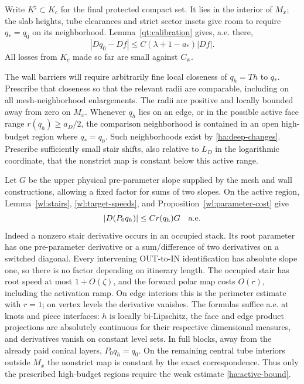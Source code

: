 \documentclass[11pt]{article}
\numberwithin{equation}{section}
\theoremstyle{definition}
\theoremstyle{remark}
\begin{document}
Write $K^\sharp\subset K_c$ for the final protected compact set.
It lies in the interior of $M_x$; the slab heights, tube clearances
and strict sector insets give room to require $q_*=q_0$ on its
neighborhood.  Lemma~\ref{qt:calibration} gives, a.e. there,
\begin{equation}\label{ha:relative-calibration}
                   |Dq_0-Df|\le C(\lambda+1-a_*)|Df|.
\end{equation}
All losses from $K_c$ made so far are small against $C_{\mathrm w}$.

The wall barriers will require arbitrarily fine local closeness of
$q_h=Th$ to $q_*$.  Prescribe that closeness so that the relevant radii
are comparable, including on all mesh-neighborhood enlargements.
The radii are positive and locally bounded away from zero on $M_x$.
Whenever $q_h$ lies on an edge, or in the possible active face range
$r(q_h)\ge a_D/2$, the comparison neighborhood is contained in an
open high-budget region where $q_*=q_0$.  Such neighborhoods exist by
\eqref{ha:deep-changes}.  Prescribe sufficiently small stair shifts,
also relative to $L_D$ in the logarithmic coordinate, that the
nonstrict map is constant below this active range.

Let $G$ be the upper physical pre-parameter slope supplied by the
mesh and wall constructions, allowing a fixed factor for sums of
two slopes.  On the active region, Lemma~\ref{wl:stairs},
\eqref{wl:target-speeds}, and Proposition~\ref{wl:parameter-cost} give
\begin{equation}\label{ha:active-bound}
                      |D(P_0q_h)|\le Cr(q_h)G
                      \quad\hbox{a.e.}
\end{equation}
Indeed a nonzero stair derivative occurs in an occupied stack.  Its
root parameter has one pre-parameter derivative or a sum/difference
of two derivatives on a switched diagonal.  Every intervening
OUT-to-IN identification has absolute slope one, so there is no
factor depending on itinerary length.  The occupied stair has root
speed at most $1+O(\zeta)$, and the forward polar map costs $O(r)$,
including the activation ramp.  On edge interiors this is the
perimeter estimate with $r=1$; on vertex levels the derivative
vanishes.  The formulas suffice a.e. at knots and piece interfaces:
$h$ is locally bi-Lipschitz, the face and edge product projections
are absolutely continuous for their respective dimensional measures,
and derivatives vanish on constant level sets.  In full blocks,
away from the already paid conical layers, $P_0q_h=q_0$.  On the
remaining central tube interiors outside $M_x$ the nonstrict map is
constant by the exact correspondence.  Thus only the prescribed
high-budget regions require the weak estimate
\eqref{ha:active-bound}.
\end{document}
